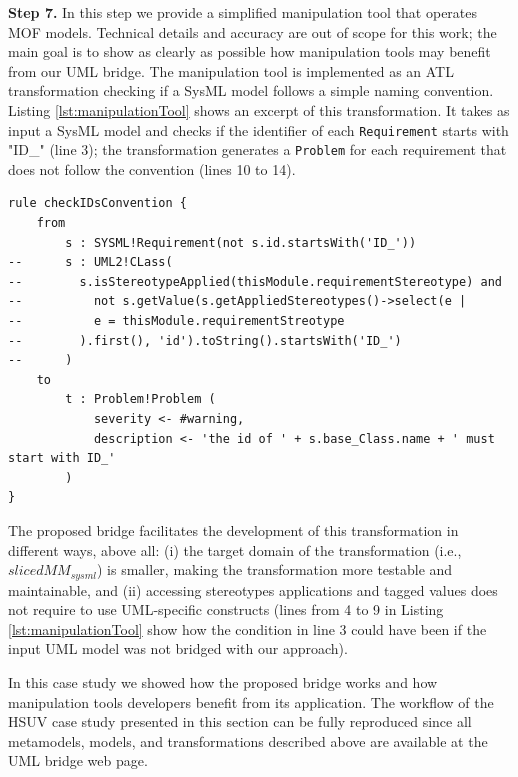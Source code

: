 \textbf{Step 7.} In this step we provide a simplified manipulation tool that operates MOF models.
Technical details and accuracy are out of scope for this work; the main goal is to show as clearly as possible how 
manipulation tools may benefit from our UML bridge.
The manipulation tool is implemented as an ATL transformation checking if a SysML model follows a simple naming convention.
Listing \ref{lst:manipulationTool} shows an excerpt of this transformation.
It takes as input a SysML model and checks if the identifier of each \texttt{Requirement} starts with "ID\_" (line 3);
the transformation generates a \texttt{Problem} for each requirement that does not follow the convention (lines 10 to 14).
%
\begin{lstlisting}[breaklines,style=AMMA,language=ATL,mathescape,rulesepcolor=\color{black},caption=ATL transformation manipulating SysML models,captionpos=b,label={lst:manipulationTool}]
rule checkIDsConvention {
	from
		s : SYSML!Requirement(not s.id.startsWith('ID_'))
--		s : UML2!CLass(
--		  s.isStereotypeApplied(thisModule.requirementStereotype) and
--			not s.getValue(s.getAppliedStereotypes()->select(e |
--			e = thisModule.requirementStreotype
--		  ).first(), 'id').toString().startsWith('ID_')
--		)		
	to
		t : Problem!Problem (
			severity <- #warning,
			description <- 'the id of ' + s.base_Class.name + ' must start with ID_'
		)
}
\end{lstlisting}

The proposed bridge facilitates
the development of this transformation in different ways, above all:
(i) the target domain of the transformation (i.e., $slicedMM_{sysml}$) is smaller,
making the transformation more testable and maintainable, and
(ii) accessing stereotypes applications and tagged values
does not require to use UML-specific constructs (lines from 4 to 9 in Listing \ref{lst:manipulationTool}
show how the condition in line 3 could have been if the input UML model was not bridged with our approach).

In this case study we showed how the proposed bridge works and how manipulation tools developers benefit
from its application.
The workflow of the HSUV case study presented in this section can be fully reproduced
since all metamodels, models, and transformations described above are available at the UML bridge web page.


